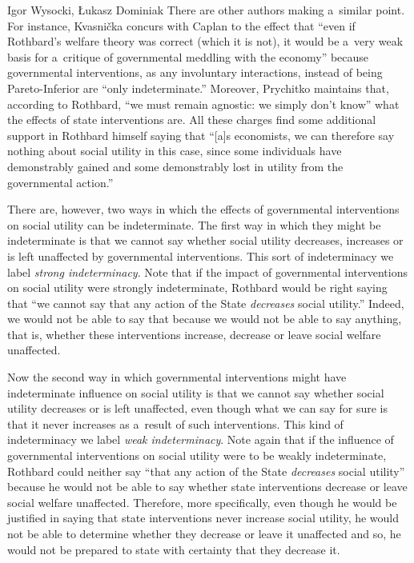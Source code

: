 \begin{artengenv}{Igor Wysocki, Łukasz Dominiak}
There are other authors making a~similar point. For instance, Kvasnička 
\parencite*[][p.49]{kvasnicka_rothbards_2008} %
 concurs with Caplan to the effect that ``even if Rothbard's welfare theory was correct (which it is not), it would be a~very weak basis for a~critique of governmental meddling with the economy'' because governmental interventions, as any involuntary interactions, instead of being Pareto-Inferior are ``only indeterminate.'' Moreover, Prychitko 
\parencite*[][p.576]{prychitko_formalism_1993} %
 maintains that, according to Rothbard, ``we must remain agnostic: we simply don't know'' what the effects of state interventions are. All these charges find some additional support in Rothbard 
\parencite*[][p.252]{rothbard_toward_2008} %
 himself saying that ``[a]s economists, we can therefore say nothing about social utility in this case, since some individuals have demonstrably gained and some demonstrably lost in utility from the governmental action.''



There are, however, two ways in which the effects of governmental interventions on social utility can be indeterminate. The first way in which they might be indeterminate is that we cannot say whether social utility decreases, increases or is left unaffected by governmental interventions. This sort of indeterminacy we label \textit{strong indeterminacy}. Note that if the impact of governmental interventions on social utility were strongly indeterminate, Rothbard would be right saying that ``we cannot say that any action of the State \textit{decreases} social utility.'' Indeed, we would not be able to say that because we would not be able to say anything, that is, whether these interventions increase, decrease or leave social welfare unaffected.



Now the second way in which governmental interventions might have indeterminate influence on social utility is that we cannot say whether social utility decreases or is left unaffected, even though what we can say for sure is that it never increases as a~result of such interventions. This kind of indeterminacy we label \textit{weak indeterminacy}. Note again that if the influence of governmental interventions on social utility were to be weakly indeterminate, Rothbard could neither say ``that any action of the State \textit{decreases} social utility'' because he would not be able to say whether state interventions decrease or leave social welfare unaffected. Therefore, more specifically, even though he would be justified in saying that state interventions never increase social utility, he would not be able to determine whether they decrease or leave it unaffected and so, he would not be prepared to state with certainty that they decrease it.




\end{artengenv}
